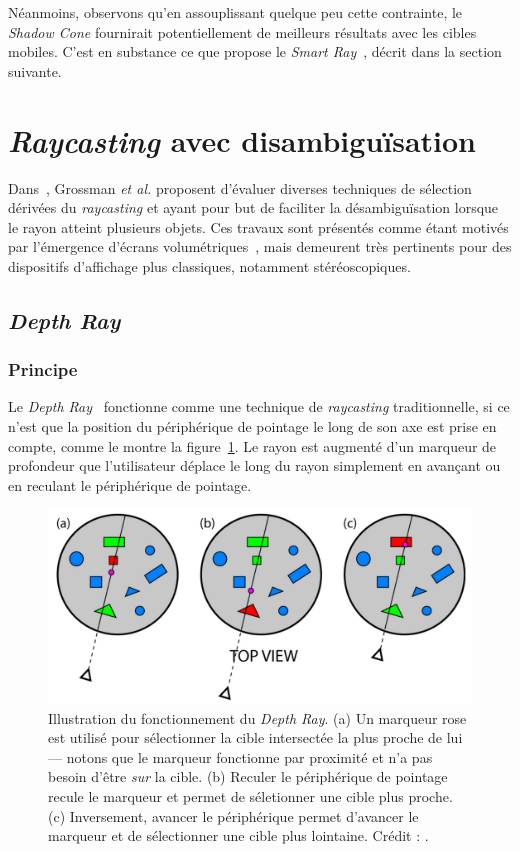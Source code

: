 	Néanmoins, observons qu'en assouplissant quelque peu cette contrainte, le \emph{Shadow Cone} fournirait potentiellement de meilleurs résultats avec les cibles mobiles. C'est en substance ce que propose le \emph{Smart Ray}~\cite{grossman2006design}, décrit dans la section suivante.	
	
\section{\emph{Raycasting} avec disambiguïsation}
	Dans~\cite{grossman2006design}, Grossman \emph{et al.} proposent d'évaluer diverses techniques de sélection dérivées du \emph{raycasting} et ayant pour but de faciliter la désambiguïsation lorsque le rayon atteint plusieurs objets. Ces travaux sont présentés comme étant motivés par l'émergence d'écrans volumétriques~\cite{ebert1999realizing}, mais demeurent très pertinents pour des dispositifs d'affichage plus classiques, notamment stéréoscopiques.

	\subsection{\emph{Depth Ray}}
	\subsubsection{Principe}
	Le \emph{Depth Ray}~\cite{grossman2006design} fonctionne comme une technique de \emph{raycasting} traditionnelle, si ce n'est que la position du périphérique de pointage le long de son axe est prise en compte, comme le montre la figure~\ref{fig:depthRay}. Le rayon est augmenté d'un marqueur de profondeur que l'utilisateur déplace le long du rayon simplement en avançant ou en reculant le périphérique de pointage.
	
	\begin{figure}[H]
		\centering
		\includegraphics[width=\textwidth]{figures/ch2/depthRay}
		\caption[Principe du \emph{Depth Ray}]{Illustration du fonctionnement du \emph{Depth Ray}. (a) Un marqueur rose est utilisé pour sélectionner la cible intersectée la plus proche de lui --- notons que le marqueur fonctionne par proximité et n'a pas besoin d'être \emph{sur} la cible. (b) Reculer le périphérique de pointage recule le marqueur et permet de séletionner une cible plus proche. (c) Inversement, avancer le périphérique permet d'avancer le marqueur et de sélectionner une cible plus lointaine. Crédit : \cite{grossman2006design}.}
		\label{fig:depthRay}
	\end{figure}
	
